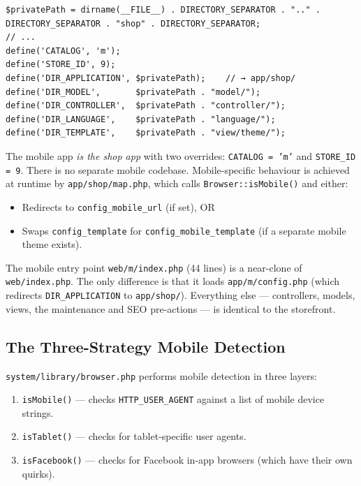 \documentclass[11pt,a4paper]{article}
\begin{document}
\begin{lstlisting}[caption={\texttt{app/m/config.php} --- the mobile config that reuses shop/ (abridged).},label={lst:mobile-config}]
$privatePath = dirname(__FILE__) . DIRECTORY_SEPARATOR . ".." . DIRECTORY_SEPARATOR . "shop" . DIRECTORY_SEPARATOR;
// ...
define('CATALOG', 'm');
define('STORE_ID', 9);
define('DIR_APPLICATION', $privatePath);    // → app/shop/
define('DIR_MODEL',       $privatePath . "model/");
define('DIR_CONTROLLER',  $privatePath . "controller/");
define('DIR_LANGUAGE',    $privatePath . "language/");
define('DIR_TEMPLATE',    $privatePath . "view/theme/");
\end{lstlisting}

The mobile app \emph{is the shop app} with two overrides:
\texttt{CATALOG = 'm'} and \texttt{STORE\_ID = 9}. There is no
separate mobile codebase. Mobile-specific behaviour is achieved at
runtime by \texttt{app/shop/map.php}, which calls
\texttt{Browser::isMobile()} and either:

\begin{itemize}[leftmargin=1.6em,itemsep=2pt]
  \item Redirects to \texttt{config\_mobile\_url} (if set), OR
  \item Swaps \texttt{config\_template} for
        \texttt{config\_mobile\_template} (if a separate mobile
        theme exists).
\end{itemize}

The mobile entry point \texttt{web/m/index.php} (44 lines) is a
near-clone of \texttt{web/index.php}. The only difference is that
it loads \texttt{app/m/config.php} (which redirects
\texttt{DIR\_APPLICATION} to \texttt{app/shop/}). Everything else
--- controllers, models, views, the maintenance and SEO pre-actions
--- is identical to the storefront.

\subsection{The Three-Strategy Mobile Detection}

\texttt{system/library/browser.php} performs mobile detection in
three layers:

\begin{enumerate}[leftmargin=1.6em,itemsep=2pt]
  \item \texttt{isMobile()} --- checks \texttt{HTTP\_USER\_AGENT}
        against a list of mobile device strings.
  \item \texttt{isTablet()} --- checks for tablet-specific user
        agents.
  \item \texttt{isFacebook()} --- checks for Facebook in-app
        browsers (which have their own quirks).
\end{enumerate}
\end{document}
